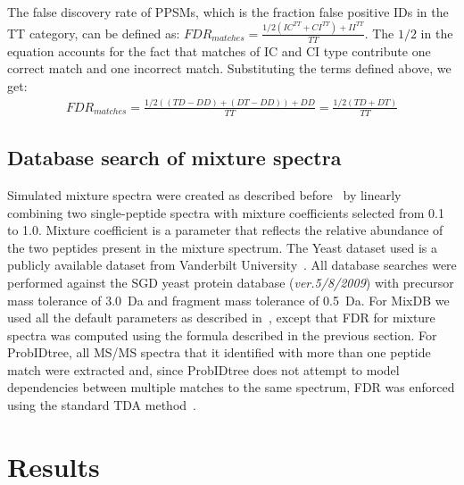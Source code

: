 \documentclass[runningheads,a4paper]{llncs}
\begin{document}
The false discovery rate of PPSMs, which is the fraction false positive IDs in the TT category, can be defined as: $FDR_{matches} = \frac{1/2(IC^{TT}+CI^{TT}) + II^{TT}}{TT}$. The $1/2$ in the equation accounts for the fact that matches of IC and CI type contribute one correct match and one incorrect match. Substituting the terms defined above, we get:
\begin{eqnarray}
FDR_{matches} = \frac{1/2((TD-DD) + (DT -DD))+ DD}{TT} 
              = \frac{1/2(TD+DT)}{TT}   
\end{eqnarray}

\subsection*{Database search of mixture spectra}
Simulated mixture spectra were created as described before~\cite{wang2010msplit} by linearly combining two single-peptide spectra with mixture coefficients selected from 0.1 to 1.0. Mixture coefficient is a parameter that reflects the relative abundance of the two peptides present in the mixture spectrum.  The Yeast dataset used is a publicly available dataset from Vanderbilt University~\cite{li2009}.  All database searches were performed against the SGD yeast protein database (\textit{ver.5/8/2009}) with precursor mass tolerance of 3.0~Da and fragment mass tolerance of 0.5~Da.  For MixDB we used all the default parameters as described in~\cite{wang2011peptide}, except that FDR for mixture spectra was computed using the formula described in the previous section.  For ProbIDtree, all MS/MS spectra that it identified with more than one peptide match were extracted and, since ProbIDtree does not attempt to model dependencies between multiple matches to the same spectrum, FDR was enforced using the standard TDA method~\cite{elias07}.

\section*{Results}
\end{document}

